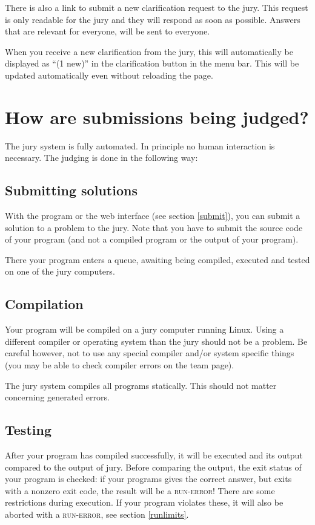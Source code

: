There is also a link to submit a new clarification request to the
jury. This request is only readable for the jury and they will respond
as soon as possible. Answers that are relevant for everyone, will be
sent to everyone.

When you receive a new clarification from the jury, this will
automatically be displayed as ``(1 new)'' in the clarification button
in the menu bar. This will be updated automatically even without reloading
the page.

\section{How are submissions being judged?}

The \DOMjudge jury system is fully automated. In principle no human
interaction is necessary. The judging is done in the following way:

\subsection{Submitting solutions}

With the  program or the web interface (see section
\ref{submit}), you can submit a solution to a problem to the jury.
Note that you have to submit the source code of your program
(and not a compiled program or the output of your program).

There your program enters a queue, awaiting being compiled, executed
and tested on one of the jury computers.

\subsection{Compilation}

Your program will be compiled on a jury computer running Linux.
Using a different compiler or operating system than the jury should
not be a problem. Be careful however, not to use any special compiler
and/or system specific things (you may be able to check compiler errors
on the team page).

The jury system compiles all programs statically. This should not
matter concerning generated errors.

\subsection{Testing}

After your program has compiled successfully, it will be executed and
its output compared to the output of jury. Before comparing the
output, the exit status of your program is checked: if your programs
gives the correct answer, but exits with a nonzero exit code, the
result will be a \textsc{run-error}! There are some restrictions during
execution. If your program violates these, it will also be aborted
with a \textsc{run-error}, see section \ref{runlimits}.

